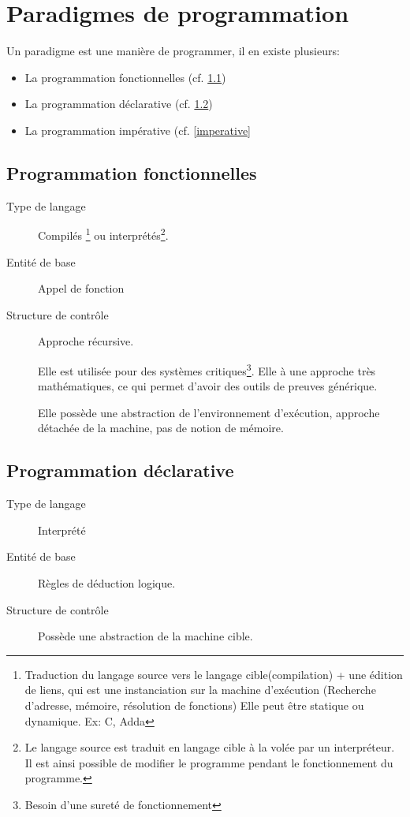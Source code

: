 \documentclass[12pt,a4paper,openany]{book}
\begin{document}
	\setcounter{tocdepth}{1}
	\setcounter{secnumdepth}{3}
	\maketitle
	\tableofcontents
	\chapter{Paradigmes de programmation}
		Un paradigme est une manière de programmer, il en existe plusieurs: 
		\begin{itemize}
			\item La programmation fonctionnelles (cf. \ref{fonctionnelles})
			\item La programmation déclarative (cf. \ref{declarative})
			\item La programmation impérative (cf. \ref{imperative}
		\end{itemize}
		\section{Programmation fonctionnelles} \label{fonctionnelles}
		\begin{description}
		\item[Type de langage] Compilés \footnote{Traduction du langage source vers le langage cible(compilation) + une édition de liens, qui est une instanciation sur la machine d'exécution (Recherche d'adresse, mémoire, résolution de fonctions) Elle peut être statique ou dynamique. Ex: C, Adda} ou interprétés\footnote{
		Le langage source est traduit en langage cible à la volée par un interpréteur. Il est ainsi possible de modifier le programme pendant le fonctionnement du programme.}. 
		\item[Entité de base] Appel de fonction
		\item[Structure de contrôle] Approche récursive. 


		Elle est utilisée pour des systèmes critiques\footnote{Besoin d'une sureté de fonctionnement}. Elle à une approche très mathématiques, ce qui 
		permet d'avoir des outils de preuves générique.

		Elle possède une abstraction de l'environnement d'exécution, approche détachée de la machine, pas de notion de mémoire.

	\end{description}
	\section{Programmation déclarative} \label{declarative}
		\begin{description}
			\item[Type de langage] Interprété
			\item[Entité de base] Règles de déduction logique.
			\item[Structure de contrôle  ]
			Possède une abstraction de la machine cible.
		\end{description}
		\newpage
\end{document}
